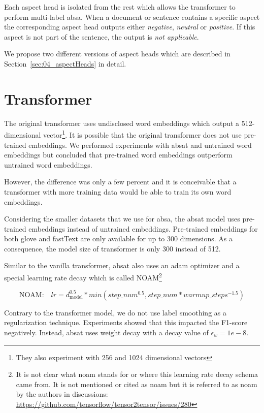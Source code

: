 Each aspect head is isolated from the rest which allows the transformer to perform multi-label \gls{absa}. When a document or sentence contains a specific aspect the corresponding aspect head outputs either \textit{negative}, \textit{neutral} or \textit{positive}. If this aspect is not part of the sentence, the output is \textit{not applicable}.

We propose two different versions of aspect heads which are described in Section~\ref{sec:04_aspectHeads} in detail.

\section{Transformer}
\label{sec:04_transformer}

The original transformer uses undisclosed word embeddings which output a 512-dimensional vector\footnote{They also experiment with 256 and 1024 dimensional vectors}. It is possible that the original transformer does not use pre-trained embeddings. We performed experiments with \gls{absat} and untrained word embeddings but concluded that pre-trained word embeddings outperform untrained word embeddings. 

However, the difference was only a few percent and it is conceivable that a transformer with more training data would be able to train its own word embeddings.
\medskip

Considering the smaller datasets that we use for \gls{absa}, the \gls{absat} model uses pre-trained embeddings instead of untrained embeddings. Pre-trained embeddings for both \gls{glove} and fastText are only available for up to 300 dimensions. As a consequence, the model size of transformer is only 300 instead of 512.
\bigskip

Similar to the vanilla transformer, \gls{absat} also uses an \gls{adam} optimizer \cite{Kingma2014} and a special learning rate decay which is called NOAM\footnote{It is not clear what noam stands for or where this learning rate decay schema came from. It is not mentioned or cited as noam but it is referred to as noam by the authors in discussions: \url{https://github.com/tensorflow/tensor2tensor/issues/280}} \cite{Vaswani2017}

\begin{equation}
	\text{NOAM:} \quad lr = d_\text{model}^{0.5} * min(step\_num^{0.5}, step\_num*warmup\_steps^{-1.5})
\end{equation}
 
Contrary to the transformer model, we do not use label smoothing as a regularization technique. Experiments showed that this impacted the F1-score negatively. Instead, \gls{absat} uses weight decay with a decay value of $\epsilon_w = 1e-8$.



